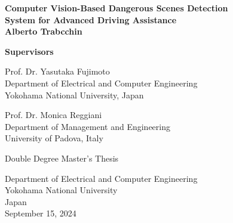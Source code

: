 \begin{titlepage}
\begin{center}

\vspace*{1cm}
\textbf{\Large{Computer Vision-Based Dangerous Scenes Detection}\\ 
        \vspace*{0.2cm}
        \Large{System for Advanced Driving Assistance}}\\
\vspace*{2cm}
\textbf{\large{Alberto Trabcchin}}\\
\vfill

\vspace*{3.5cm}

\begin{flushright}
\textbf{Supervisors} \\
\vspace*{1cm}

Prof. Dr. Yasutaka Fujimoto \\
Department of Electrical and Computer Engineering \\
Yokohama National University, Japan

\vspace*{1cm}

Prof. Dr. Monica Reggiani \\
Department of Management and Engineering \\
University of Padova, Italy

\end{flushright}

\vfill

Double Degree Master's Thesis\\
    
\vspace{0.8cm}

    
Department of Electrical and Computer Engineering\\
Yokohama National University\\
Japan\\
September 15, 2024
            
\end{center}
\end{titlepage}

\afterpage{\blankpage}
